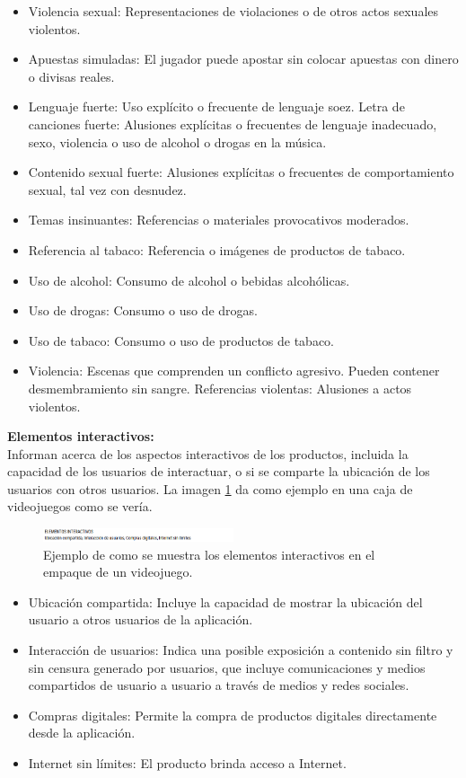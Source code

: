 \begin{itemize}
				\item Violencia sexual: Representaciones de violaciones o de otros actos sexuales violentos.
				\item Apuestas simuladas: El jugador puede apostar sin colocar apuestas con dinero o divisas reales.
				\item Lenguaje fuerte: Uso explícito o frecuente de lenguaje soez.
				Letra de canciones fuerte: Alusiones explícitas o frecuentes de lenguaje inadecuado, sexo, violencia o uso de alcohol o drogas en la música.
				\item Contenido sexual fuerte: Alusiones explícitas o frecuentes de comportamiento sexual, tal vez con desnudez.
				\item Temas insinuantes: Referencias o materiales provocativos moderados.
				\item Referencia al tabaco: Referencia o imágenes de productos de tabaco.
				\item Uso de alcohol: Consumo de alcohol o bebidas alcohólicas.
				\item Uso de drogas: Consumo o uso de drogas.
				\item Uso de tabaco: Consumo o uso de productos de tabaco.
				\item Violencia: Escenas que comprenden un conflicto agresivo. Pueden contener desmembramiento sin sangre.
				Referencias violentas: Alusiones a actos violentos.
			\end{itemize}
			
			\textbf{Elementos interactivos: } 
			\\[1pt]
			Informan acerca de los aspectos interactivos de los productos, incluida la capacidad de los usuarios de interactuar, o si se comparte la ubicación de los usuarios con otros usuarios. La imagen \ref{fig:clasInt} da como ejemplo en una caja de videojuegos como se vería. 
			\\[1pt]
			
				\begin{figure}
				\centering
				\includegraphics[width=0.5\textwidth]{03MarcoTeorico/imageR/clasInt}
				\caption{Ejemplo de como se muestra los elementos interactivos en el empaque de un videojuego.}
				\label{fig:clasInt}
				\end{figure}
			
			
			\begin{itemize}
			
			\item Ubicación compartida: Incluye la capacidad de mostrar la ubicación del usuario a otros usuarios de la aplicación.
			\item Interacción de usuarios: Indica una posible exposición a contenido sin filtro y sin censura generado por usuarios, que incluye comunicaciones y medios compartidos de usuario a usuario a través de medios y redes sociales.
			\item Compras digitales: Permite la compra de productos digitales directamente desde la aplicación.
			\item Internet sin límites: El producto brinda acceso a Internet.
		\end{itemize}
		
